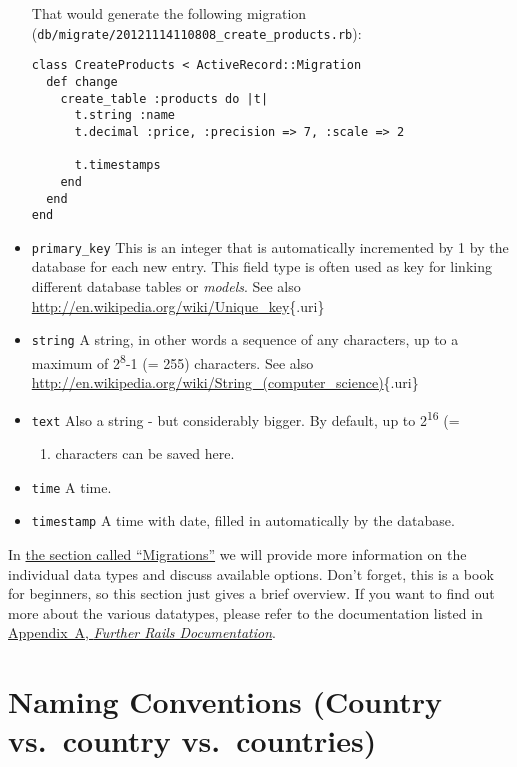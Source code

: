 \documentclass[a4paper]{book}
\newcounter{tab}[chapter]
\begin{document}
\begin{itemize}
  That would generate the following migration (\texttt{db/migrate/20121114110808\_create\_products.rb}):

\begin{shaded}\begin{verbatim}
class CreateProducts < ActiveRecord::Migration
  def change
    create_table :products do |t|
      t.string :name
      t.decimal :price, :precision => 7, :scale => 2

      t.timestamps
    end
  end
end
\end{verbatim}\end{shaded}
\item
  \texttt{primary\_key} This is an integer that is automatically incremented by 1 by the database for each new entry. This field type is often used as key for linking different database tables or \emph{models}. See also \url{http://en.wikipedia.org/wiki/Unique_key}\{.uri\}
\item
  \texttt{string} A string, in other words a sequence of any characters, up to a maximum of 2\textsuperscript{8}-1 (= 255) characters. See also \url{http://en.wikipedia.org/wiki/String_(computer_science)}\{.uri\}
\item
  \texttt{text} Also a string - but considerably bigger. By default, up to 2\textsuperscript{16} (=

  \begin{enumerate}
  \def\labelenumi{\arabic{enumi})}
  \setcounter{enumi}{65535}
  \itemsep1pt\parskip0pt
  \item
    characters can be saved here.
  \end{enumerate}
\item
  \texttt{time} A time.
\item
  \texttt{timestamp} A time with date, filled in automatically by the database.
\end{itemize}

In \hyperref[activerecordux5fmigration]{the section called “Migrations”} we will provide more information on the individual data types and discuss available options. Don't forget, this is a book for beginners, so this section just gives a brief overview. If you want to find out more about the various datatypes, please refer to the documentation listed in \hyperref[weiterfuehrendeux5fdoku]{Appendix~A, \emph{Further Rails Documentation}}.

\section{Naming Conventions (Country vs.~country vs.~countries)}\label{naming-conventions-country-vs.country-vs.countries}
\end{document}
